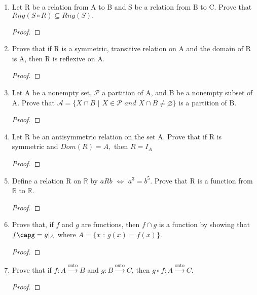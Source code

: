 \documentclass[11pt]{article}
\begin{document}
\begin{enumerate}
    \item Let R be a relation from A to B and S be a relation from B to C. \newline
    Prove that $Rng(S\circ R) \subseteq Rng(S).$
        \begin{proof}
        \end{proof}
        
    \item Prove that if R is a symmetric, transitive relation on A and the domain of R is A, then R is reflexive on A. 
        \begin{proof}
        \end{proof}
        
    \item Let A be a nonempty set, $\mathscr{P}$ a partition of A, and B be a nonempty subset of A. \newline Prove that $\mathscr{A}=\{X \cap B$ $|$ $X \in \mathscr{P}$ $and$ $X \cap B \neq \varnothing \}$ is a partition of B.
        \begin{proof}
        \end{proof}
        
    \item Let R be an antisymmetric relation on the set A. 
    \newnline Prove that if R is symmetric and $Dom(R) = A,$ then $R=I_A$
        \begin{proof}
        \end{proof}
        
    \item Define a relation R on $\mathbb{R}$ by $aRb$ $\iff$ $a^3=b^5$. Prove that R is a function from $\mathbb{R}$ to $\mathbb{R}.$
        \begin{proof}
        \end{proof}
        
    \item Prove that, if $f$ and $g$ are functions, then $f \cap g$ is a function by showing that $f\capg = g|_{A}$ where \newline $A = \{x$ : $g(x) = f(x) \}.$
        \begin{proof}
        \end{proof}
        
    \item Prove that if $f:A \xrightarrow{\text{onto}} B$ and $g:B\xrightarrow{\text{onto}} C$, then $g\circ f:A \xrightarrow{\text{onto}} C.$
        \begin{proof}
        \end{proof}
        

\end{enumerate}
\end{document}
